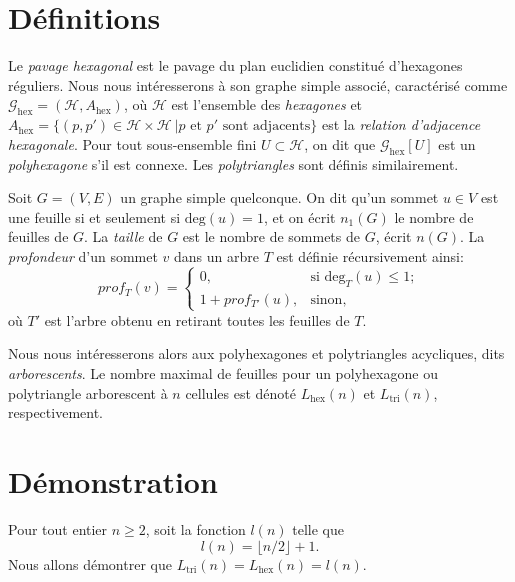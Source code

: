 \documentclass{article}
\theoremstyle{definition}
\newcommand{\Lhex}{L_{\text{hex}}}
\newcommand{\Ltri}{L_{\text{tri}}}
\newcommand{\Ghex}{\mathcal{G}_{\text{hex}} }
\newcommand{\Hex}{\mathcal{H}}
\newcommand{\hex}{\text{hex}}
\begin{document}
\section{Définitions}

Le \emph{pavage hexagonal} est le pavage du plan euclidien constitué
d'hexagones réguliers. Nous nous intéresserons à son graphe simple
associé, caractérisé comme $\Ghex = (\Hex, A_{\text{hex}})$, où $\Hex$
est l'ensemble des \emph{hexagones} et $A_\hex = \{(p,p') \in \Hex 
\times \Hex\ | \text{$p$ et $p'$ sont adjacents}\}$ est la 
\emph{relation d'adjacence hexagonale}. Pour tout sous-ensemble fini $U 
\subset \Hex$, on dit que $\Ghex[U]$ est un \emph{polyhexagone} s'il est 
connexe. Les \emph{polytriangles} sont définis similairement.

Soit $G = (V,E)$ un graphe simple quelconque. On dit qu'un sommet 
$u \in V$ est une feuille si et seulement si $\text{deg}(u) = 1$, 
et on écrit $n_1(G)$ le nombre de feuilles de $G$. La 
\emph{taille} de $G$ est le nombre de sommets de $G$, écrit $n(G)$.
La \emph{profondeur} d'un sommet $v$ dans un arbre $T$ est définie 
récursivement ainsi:
\[
   prof_T(v) =
   \begin{cases}
      0, \qquad & \text{si $\text{deg}_T(u) \leq 1$}; \\
      1 + prof_{T'}(u), & \text{sinon},
   \end{cases}
\]
où $T'$ est l'arbre obtenu en retirant toutes les feuilles de $T$.

Nous nous intéresserons alors aux polyhexagones et polytriangles
acycliques, dits \emph{arborescents}. Le nombre maximal de feuilles 
pour un polyhexagone ou polytriangle arborescent à $n$ cellules est
dénoté $\Lhex(n)$ et $\Ltri(n)$, respectivement.

\section{Démonstration}

Pour tout entier $n \geq 2$, soit la fonction $l(n)$ telle que
\begin{equation}
   \label{eq:l}
   l(n) = 
         \lfloor n/2 \rfloor + 1.
\end{equation}
Nous allons démontrer que $\Ltri(n) = \Lhex(n) = l(n)$.
\end{document}
